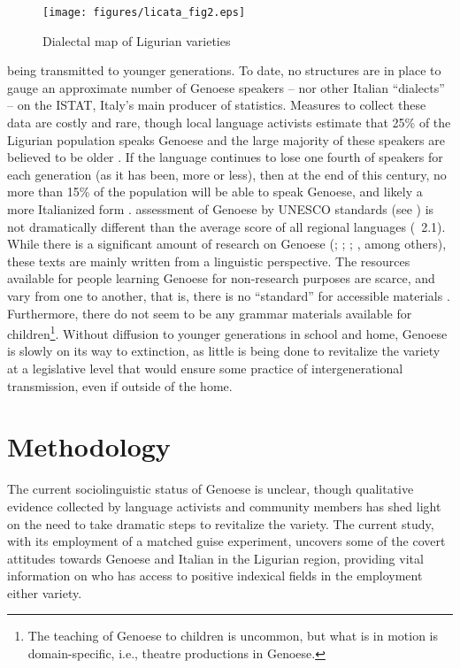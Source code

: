 \documentclass[output=paper,colorlinks,citecolor=brown]{langscibook}
\begin{document}
\begin{figure}
    \texttt{[image: figures/licata\_fig2.eps]}
    \caption{Dialectal map of Ligurian varieties \citep{toso99}}
    \label{fig:licata:02}
\end{figure}

being transmitted to younger generations. To date, no structures are in place to gauge an approximate number of Genoese speakers – nor other Italian “dialects” – on the ISTAT, Italy’s main producer of statistics. Measures to collect these data are costly and rare, though local language activists estimate that 25\% of the Ligurian population speaks Genoese and the large majority of these speakers are believed to be older \citep{acqu18b}. If the language continues to lose one fourth of speakers for each generation (as it has been, more or less), then at the end of this century, no more than 15\% of the population will be able to speak Genoese, and likely a more Italianized form \citep{colu09}. \cite{colu09} assessment of Genoese by UNESCO standards (see \cite{bren03}) is not dramatically different than the average score of all regional languages (~2.1). While there is a significant amount of research on Genoese (\cite{toso99}; \cite{gism55}; \cite{forn88}; \cite{cost93}, among others), these texts are mainly written from a linguistic perspective. The resources available for people learning Genoese for non-research purposes are scarce, and vary from one to another, that is, there is no “standard” for accessible materials \citep{acqu18a}. Furthermore, there do not seem to be any grammar materials available for children\footnote{The teaching of Genoese to children is uncommon, but what is in motion is domain-specific, i.e., theatre productions in Genoese.}.  Without diffusion to younger generations in school and home, Genoese is slowly on its way to extinction, as little is being done to revitalize the variety at a legislative level that would ensure some practice of intergenerational transmission, even if outside of the home.

\section{Methodology}
The current sociolinguistic status of Genoese is unclear, though qualitative evidence collected by language activists and community members has shed light on the need to take dramatic steps to revitalize the variety. The current study, with its employment of a matched guise experiment, uncovers some of the covert attitudes towards Genoese and Italian in the Ligurian region, providing vital information on who has access to positive indexical fields in the employment either variety.
\end{document}
